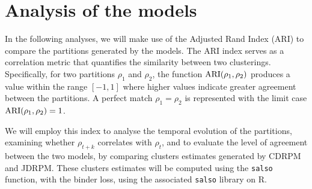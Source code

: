 \documentclass[12pt,	%
	a4paper,		%
	twoside,		%
	openright,		%
	titlepage,%
	]{book}
\theoremstyle{definition}
\let\cite\citep
\begin{document}
\chapter{Analysis of the models}
\label{chap: testing}



In the following analyses, we will make use of the Adjusted Rand Index (ARI) \cite{ari-paper} to compare the partitions generated by the models. The ARI index serves as a correlation metric that quantifies the similarity between two clusterings. Specifically, for two partitions $\rho_1$ and $\rho_2$, the function $\operatorname{ARI}(\rho_1,\rho_2)$ produces a value within the range $[-1,1]$ where higher values indicate greater agreement between the partitions. A perfect match $\rho_1=\rho_2$ is represented with the limit case $\operatorname{ARI}(\rho_1,\rho_2)=1$.


We will employ this index to analyse the temporal evolution of the partitions, examining whether $\rho_{t+k}$ correlates with $\rho_{t}$, and to evaluate the level of agreement between the two models, by comparing clusters estimates generated by CDRPM and JDRPM. These clusters estimates will be computed using the \texttt{salso} function, with the binder loss, using the associated \texttt{salso} library \cite{salso} on R.

\end{document}
